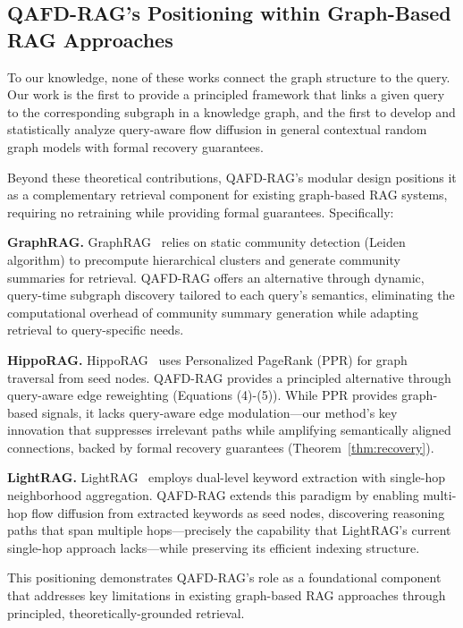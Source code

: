 \documentclass{article} %
\begin{document}
\subsection{QAFD-RAG's Positioning within Graph-Based RAG Approaches}

To our knowledge, none of these works connect the graph structure to the query. Our work is the first to provide a principled framework that links a given query to the corresponding subgraph in a knowledge graph, and the first to develop and statistically analyze query-aware flow diffusion in general contextual random graph models with formal recovery guarantees. 

{Beyond these theoretical contributions, QAFD-RAG's modular design positions it as a complementary retrieval component for existing graph-based RAG systems, requiring no retraining while providing formal guarantees. Specifically:}

{\textbf{GraphRAG.} GraphRAG~\citep{edge2024graphrag} relies on static community detection (Leiden algorithm) to precompute hierarchical clusters and generate community summaries for retrieval. QAFD-RAG offers an alternative through dynamic, query-time subgraph discovery tailored to each query's semantics, eliminating the computational overhead of community summary generation while adapting retrieval to query-specific needs.}

{\textbf{HippoRAG.} HippoRAG~\citep{jimenez2024hipporag} uses Personalized PageRank (PPR) for graph traversal from seed nodes. QAFD-RAG provides a principled alternative through query-aware edge reweighting (Equations (4)-(5)). While PPR provides graph-based signals, it lacks query-aware edge modulation—our method's key innovation that suppresses irrelevant paths while amplifying semantically aligned connections, backed by formal recovery guarantees (Theorem~\ref{thm:recovery}).}

{\textbf{LightRAG.} LightRAG~\citep{guo2024lightrag} employs dual-level keyword extraction with single-hop neighborhood aggregation. QAFD-RAG extends this paradigm by enabling multi-hop flow diffusion from extracted keywords as seed nodes, discovering reasoning paths that span multiple hops—precisely the capability that LightRAG's current single-hop approach lacks—while preserving its efficient indexing structure.}

{This positioning demonstrates QAFD-RAG's role as a foundational component that addresses key limitations in existing graph-based RAG approaches through principled, theoretically-grounded retrieval.}
\end{document}
